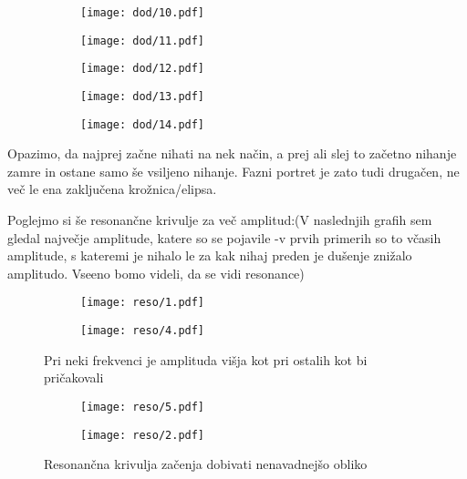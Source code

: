 \documentclass{article}
\begin{document}
\begin{figure}[H]
\begin{subfigure}{.3\textwidth}
\texttt{[image: dod/10.pdf]}
\end{subfigure}
\begin{subfigure}{.3\textwidth}
\texttt{[image: dod/11.pdf]}
\end{subfigure}
\begin{subfigure}{.3\textwidth}
\texttt{[image: dod/12.pdf]}
\end{subfigure}
\end{figure}

\begin{figure}[H]
\begin{subfigure}{.5\textwidth}
\texttt{[image: dod/13.pdf]}
\end{subfigure}
\begin{subfigure}{.5\textwidth}
\texttt{[image: dod/14.pdf]}
\end{subfigure}
\end{figure}

Opazimo, da najprej začne nihati na nek način, a prej ali slej to začetno nihanje zamre in ostane samo še vsiljeno nihanje. Fazni portret je zato tudi drugačen, ne več le ena zaključena krožnica/elipsa.

Poglejmo si še resonančne krivulje za več amplitud:(V naslednjih grafih sem gledal največje amplitude, katere so se pojavile -v prvih primerih so to včasih amplitude, s kateremi je nihalo le za kak nihaj preden je dušenje znižalo amplitudo. Vseeno bomo videli, da se vidi resonance)

\begin{figure}[H]
\begin{subfigure}{.5\textwidth}
\texttt{[image: reso/1.pdf]}
\end{subfigure}
\begin{subfigure}{.5\textwidth}
\texttt{[image: reso/4.pdf]}
\end{subfigure}
\caption*{Pri neki frekvenci je amplituda višja kot pri ostalih kot bi pričakovali}
\end{figure}

\begin{figure}[H]
\begin{subfigure}{.5\textwidth}
\texttt{[image: reso/5.pdf]}
\end{subfigure}
\begin{subfigure}{.5\textwidth}
\texttt{[image: reso/2.pdf]}
\end{subfigure}
\caption*{Resonančna krivulja začenja dobivati nenavadnejšo obliko}
\end{figure}
\end{document}
